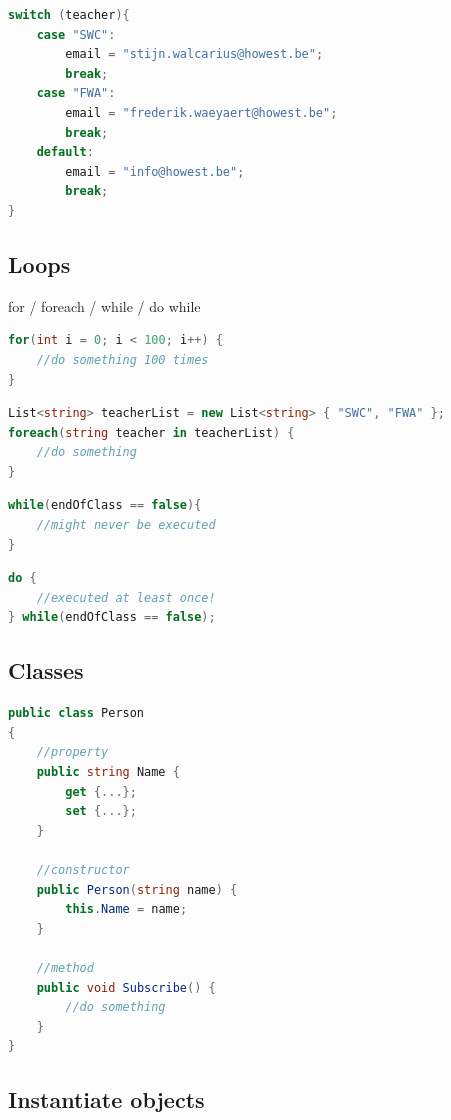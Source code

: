 \documentclass{article}
\begin{document}
\begin{lstlisting}[language=csharp]
switch (teacher){
    case "SWC":
        email = "stijn.walcarius@howest.be";
        break;
    case "FWA":
        email = "frederik.waeyaert@howest.be";
        break;
    default:
        email = "info@howest.be";
        break;
}
\end{lstlisting}

\subsection{Loops}
for / foreach / while / do while

\begin{lstlisting}[language=csharp]
for(int i = 0; i < 100; i++) {
    //do something 100 times
}
\end{lstlisting}

\begin{lstlisting}[language=csharp]
List<string> teacherList = new List<string> { "SWC", "FWA" };
foreach(string teacher in teacherList) {
    //do something
}
\end{lstlisting}

\begin{lstlisting}[language=csharp]
while(endOfClass == false){
    //might never be executed
}
\end{lstlisting}

\begin{lstlisting}[language=csharp]
do {
    //executed at least once!
} while(endOfClass == false);
\end{lstlisting}

\subsection{Classes}
\begin{lstlisting}[language=csharp]
public class Person
{
    //property
    public string Name { 
        get {...};
        set {...}; 
    }

    //constructor
    public Person(string name) {
        this.Name = name;
    }

    //method
    public void Subscribe() {
        //do something
    }
}
\end{lstlisting}

\subsection{Instantiate objects}
\end{document}
